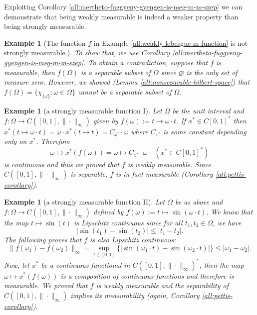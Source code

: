 \documentclass[a4paper, 12pt]{article}
\newtheorem{example}[lem]{Example}
\begin{document}
Exploiting Corollary \ref{all:mertheto-fuggveny-gyengen-is-meg-m-m-szep} we can demonstrate that being weakly measurable is indeed a weaker property than being strongly measurable.
\begin{example}[The function $f$ in Example \ref{all:weakly-lebesgue-m-function} is not strongly measurable.] \label{all:not-strongly-measurable-function}\normalfont
To show that, we use Corollary \ref{all:mertheto-fuggveny-gyengen-is-meg-m-m-szep}. To obtain a contradiction, suppose that $f$ is measurable, then $f(\Omega)$ is a separable subset of $\Omega$ since $\varnothing$ is the only set of measure zero. However, we showed (Lemma \ref{all:nonseparable-hilbert-space}) that $f(\Omega) = \lbrace \chi_{\lbrace \omega \rbrace} : \omega \in \Omega \rbrace$ cannot be a separable subset of $\Omega$.
\end{example}
\begin{example}[a strongly measurable function I]\normalfont Let $\Omega$ be the unit interval and $f \colon \Omega \to C([0,1], \| \cdot \|_{\infty})$ given by $f(\omega) := t \mapsto \omega \cdot t$. If $x^* \in C[0,1]^*$ then $x^*(t \mapsto \omega \cdot t) = \omega \cdot x^*(t \mapsto t) = C_{x^*}\cdot \omega$ where $C_{x^*}$ is some constant depending only on $x^*$. Therefore
$$
\omega \mapsto x^*(f(\omega)) = \omega \mapsto C_{x^*}\cdot \omega \quad (x^* \in C[0,1]^*)
$$
is continuous and thus we proved that $f$ is weakly measurable. Since $C([0,1], \| \cdot \|_{\infty})$ is separable, $f$ is in fact measurable (Corollary \ref{all:pettis-corollary}).
\end{example}
\begin{example}[a strongly measurable function II]\normalfont Let $\Omega$ be as above and $f \colon \Omega \to C([0,1], \| \cdot \|_{\infty})$ defined by
$f(\omega) := t \mapsto \sin(\omega \cdot t)$. We know that the map $t \mapsto \sin(t)$ is Lipschitz continuous since for all $t_1, t_2 \in \Omega$, we have
$$
|\sin(t_1) - \sin(t_2)| \leqslant |t_1 - t_2|.
$$
The following proves that $f$ is also Lipschitz continuous:
$$
\|f(\omega_1) - f(\omega_2) \|_{\infty} = \sup_{t \in [0,1]} \lbrace |\sin(\omega_1 \cdot t) - \sin(\omega_2 \cdot t)| \rbrace \leqslant |\omega_1 - \omega_2|.
$$
Now, let $x^*$ be a continuous functional in $C([0,1], \| \cdot \|_{\infty})^*$, then the map $\omega \mapsto x^*(f(\omega))$ is a composition of continuous functions and therefore is measurable.
We proved that $f$ is weakly measurable and the separability of $C([0,1], \| \cdot \|_{\infty})$ implies its measurability (again, Corollary \ref{all:pettis-corollary}).
\end{example}
\end{document}
